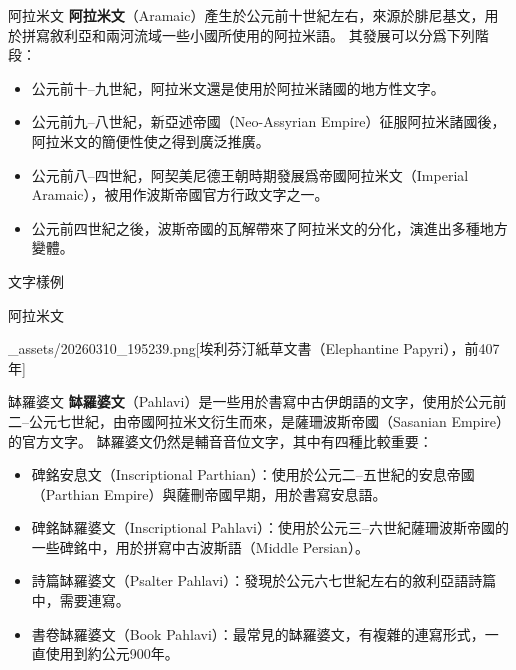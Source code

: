 \documentclass[aspectratio=169]{beamer}
\begin{document}
\begin{frame}{阿拉米文}
    \textbf{阿拉米文}（Aramaic）產生於公元前十世紀左右，來源於腓尼基文，用於拼寫敘利亞和兩河流域一些小國所使用的阿拉米語。
    其發展可以分爲下列階段：

    \begin{itemize}
        \item 公元前十--九世紀，阿拉米文還是使用於阿拉米諸國的地方性文字。
        \item 公元前九--八世紀，新亞述帝國（Neo-Assyrian Empire）征服阿拉米諸國後，阿拉米文的簡便性使之得到廣泛推廣。
        \item 公元前八--四世紀，阿契美尼德王朝時期發展爲帝國阿拉米文（Imperial Aramaic），被用作波斯帝國官方行政文字之一。
        \item 公元前四世紀之後，波斯帝國的瓦解帶來了阿拉米文的分化，演進出多種地方變體。
    \end{itemize}

    \begin{block}{文字樣例}
        \raggedleft
    \end{block}
\end{frame}

\begin{frame}{阿拉米文}
    \begin{OneImage}[htbp][\linewidth][0.75\textheight]{_assets/20260310_195239.png}[埃利芬汀紙草文書（Elephantine Papyri），前407年]\end{OneImage}
\end{frame}

\begin{frame}{缽羅婆文}
    \textbf{缽羅婆文}（Pahlavi）是一些用於書寫中古伊朗語的文字，使用於公元前二--公元七世紀，由帝國阿拉米文衍生而來，是薩珊波斯帝國（Sasanian Empire）的官方文字。
    缽羅婆文仍然是輔音音位文字，其中有四種比較重要：
    \begin{itemize}
        \item 碑銘安息文（Inscriptional Parthian）：使用於公元二--五世紀的安息帝國（Parthian Empire）與薩刪帝國早期，用於書寫安息語。
        \item 碑銘缽羅婆文（Inscriptional Pahlavi）：使用於公元三--六世紀薩珊波斯帝國的一些碑銘中，用於拼寫中古波斯語（Middle Persian）。
        \item 詩篇缽羅婆文（Psalter Pahlavi）：發現於公元六七世紀左右的敘利亞語詩篇中，需要連寫。
        \item 書卷缽羅婆文（Book Pahlavi）：最常見的缽羅婆文，有複雜的連寫形式，一直使用到約公元900年。
    \end{itemize}
\end{frame}
\end{document}
